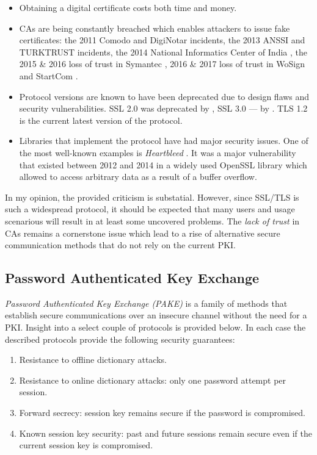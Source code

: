 \begin{itemize}
    \item Obtaining a digital certificate costs both time and money.
    \item CAs are being constantly breached which enables attackers to issue fake certificates: the 2011 Comodo \cite{comodo:2017:ca-incident} and DigiNotar \cite{diginotar:2017:ca-incident} incidents, the 2013 ANSSI \cite{anssi:2017:ca-incident} and TURKTRUST \cite{turktrust:2017:ca-incident-0} incidents, the 2014 National Informatics Center of India \cite{nic:2017:ca-incident}, the 2015 \& 2016 loss of trust in Symantec \cite{symantec:2017:ca-incident-0, symantec:2017:ca-incident-1}, 2016 \& 2017 loss of trust in WoSign and StartCom \cite{startcom:2017:ca-incident-0, startcom:2017:ca-incident-1}.
    \item Protocol versions are known to have been deprecated due to design flaws and security vulnerabilities. SSL 2.0 was deprecated by \cite{rfc6176}, SSL 3.0  --- by \cite{rfc7568}. TLS 1.2 is the current latest version of the protocol.
    \item Libraries that implement the protocol have had major security issues. One of the most well-known examples is \emph{Heartbleed} \cite{durumeric2014matter}. It was a major vulnerability that existed between 2012 and 2014 in a widely used OpenSSL library which allowed to access arbitrary data as a result of a buffer overflow.
  \end{itemize}

In my opinion, the provided criticism is substatial. However, since SSL/TLS is such a widespread protocol, it should be expected that many users and usage scenarious will result in at least some uncovered problems. The \emph{lack of trust} in CAs remains a cornerstone issue which lead to a rise of alternative secure communication methods that do not rely on the current PKI.

\subsection{Password Authenticated Key Exchange}
\label{subsec:pake}

\emph{Password Authenticated Key Exchange (PAKE)} is a family of methods that establish secure communications over an insecure channel without the need for a PKI. Insight into a select couple of protocols is provided below. In each case the described protocols provide the following security guarantees:

\begin{enumerate}
    \item Resistance to offline dictionary attacks.
    \item Resistance to online dictionary attacks: only one password attempt per session.
    \item Forward secrecy: session key remains secure if the password is compromised.
    \item Known session key security: past and future sessions remain secure even if the current session key is compromised.
  \end{enumerate}


